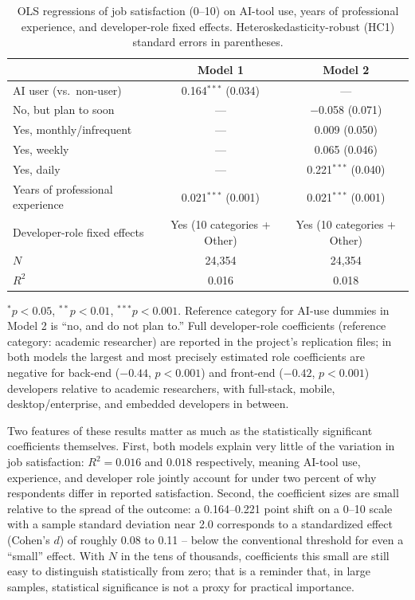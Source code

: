 \documentclass[11pt]{article}
\begin{document}
\begin{table}[h]
\centering
\caption{OLS regressions of job satisfaction (0--10) on AI-tool use,
years of professional experience, and developer-role fixed effects.
Heteroskedasticity-robust (HC1) standard errors in parentheses.}
\label{tab:regression}
\begin{tabular}{lcc}
\toprule
 & Model 1 & Model 2 \\
\midrule
AI user (vs.\ non-user)            & 0.164$^{***}$ (0.034) & --- \\
\quad No, but plan to soon         & --- & $-$0.058 (0.071) \\
\quad Yes, monthly/infrequent      & --- & 0.009 (0.050) \\
\quad Yes, weekly                  & --- & 0.065 (0.046) \\
\quad Yes, daily                   & --- & 0.221$^{***}$ (0.040) \\
Years of professional experience   & 0.021$^{***}$ (0.001) & 0.021$^{***}$ (0.001) \\
\midrule
Developer-role fixed effects       & Yes (10 categories + Other) & Yes (10 categories + Other) \\
$N$                                 & 24{,}354 & 24{,}354 \\
$R^2$                               & 0.016 & 0.018 \\
\bottomrule
\end{tabular}

\medskip
\noindent\footnotesize $^{*}p<0.05$, $^{**}p<0.01$, $^{***}p<0.001$. Reference category
for AI-use dummies in Model 2 is ``no, and do not plan to.'' Full
developer-role coefficients (reference category: academic researcher) are
reported in the project's replication files; in both models the largest
and most precisely estimated role coefficients are negative for back-end
($-0.44$, $p<0.001$) and front-end ($-0.42$, $p<0.001$) developers relative
to academic researchers, with full-stack, mobile, desktop/enterprise, and
embedded developers in between.
\normalsize
\end{table}

Two features of these results matter as much as the statistically
significant coefficients themselves. First, both models explain very
little of the variation in job satisfaction: $R^2 = 0.016$ and $0.018$
respectively, meaning AI-tool use, experience, and developer role jointly
account for under two percent of why respondents differ in reported
satisfaction. Second, the coefficient sizes are small relative to the
spread of the outcome: a 0.164--0.221 point shift on a 0--10 scale with a
sample standard deviation near 2.0 corresponds to a standardized effect
(Cohen's $d$) of roughly 0.08 to 0.11 -- below the conventional threshold
for even a ``small'' effect. With $N$ in the tens of thousands, coefficients
this small are still easy to distinguish statistically from zero; that is
a reminder that, in large samples, statistical significance is not a
proxy for practical importance.
\end{document}
